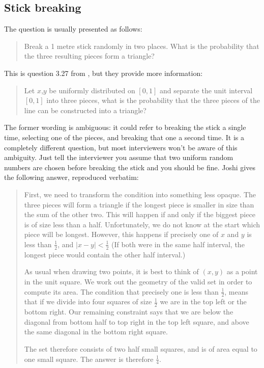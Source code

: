 \documentclass[a4paper]{article}
\begin{document}
\subsection{Stick breaking}
\label{subsec:stickbreaking}
The question is usually presented as follows:
\begin{quote}
Break a 1 metre stick randomly in two places. What is the probability that the three resulting pieces form a triangle?
\end{quote}
This is question 3.27 from \citet{JoshiQA}, but they provide more information:
\begin{quote}
Let $x$,$y$ be uniformly distributed on $[0, 1]$ and separate the
unit interval $[0,1]$ into three pieces, what is the probability that the three pieces of the
line can be constructed into a triangle?
\end{quote}
The former wording is ambiguous: it could refer to breaking the stick a single time, selecting one of the pieces, and breaking that one a second time.
It is a completely different question, but most interviewers won't be aware of this ambiguity.
Just tell the interviewer you assume that two uniform random numbers are chosen before breaking the stick and you should be fine.
Joshi gives the following answer, reproduced verbatim:
\begin{quotation}
First, we need to transform the condition into something less opaque.
The three pieces will form a triangle if the longest piece is smaller in size than the sum of the other two.
This will happen if and only if the biggest piece is of size less than a half.
Unfortunately, we do not know at the start which piece will be longest.
However, this happens if precisely one of $x$ and $y$ is less than $\frac{1}{2}$, and $|x-y|<\frac{1}{2}$ (If both were in the same half interval, the longest piece would contain the other half interval.)

As usual when drawing two points, it is best to think of $(x,y)$ as a point in the unit square.
We work out the geometry of the valid set in order to compute its area.
The condition that precisely one is less than $\frac{1}{2}$, means that if we divide into  four squares of size $\frac{1}{2}$ we are in the top left or the bottom right.
Our remaining constraint says that we are below the diagonal from bottom half to top right in
the top left square, and above the same diagonal in the bottom right square.

The set therefore consists of two half small squares, and is of area equal to one small square.
The answer is therefore $\frac{1}{4}$.
\end{quotation}
\end{document}
